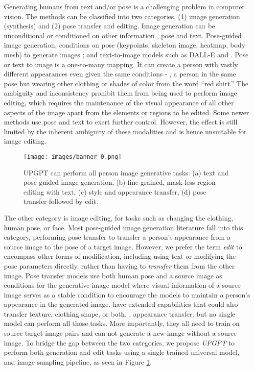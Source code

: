 \documentclass[10pt,twocolumn,letterpaper]{article}
\begin{document}
Generating humans from text and/or pose is a challenging problem in computer vision. The methods can be classified into two categories, (1) image generation (synthesis) and (2) pose transfer and editing. Image generation can be unconditional or conditioned on other information \eg, pose and text. Pose-guided image generation, conditions on pose (keypoints, skeleton image, heatmap, body mesh) to generate images \cite{pix2pix, vqgan, gaugan, AlBahar2021}; and text-to-image models such as DALL-E\cite{dalle,dalle2} and \cite{stackgan,attngan, dmgan, dfgan, xmcgan, imagen}. Pose or text to image is a one-to-many mapping. It can create a person with vastly different appearances even given the same conditions - \eg, a person in the same pose but wearing other clothing or shades of color from the word ``red shirt.'' The ambiguity and inconsistency prohibit them from being used to perform image editing, which requires the maintenance of the visual appearance of all other aspects of the image apart from the elements or regions to be edited. Some newer methods \cite{kpe, text2human, human_diffusion} use pose and text to exert further control. However, the effect is still limited by the inherent ambiguity of these modalities and is hence unsuitable for image editing.

\begin{figure}[!tb]
    \begin{center}
        \texttt{[image: images/banner\_0.png]}
    \end{center}
\caption{UPGPT can perform all person image generative tasks: (a) text and pose guided image generation, (b) fine-grained, mask-less region editing with text, (c) style and appearance transfer, (d) pose transfer followed by edit.} 
\label{fig:banner}
\vspace{-1mm}
\end{figure}
The other category is image editing, for tasks such as changing the clothing, human pose, or face. Most pose-guided image generation literature fall into this category, performing pose transfer to transfer a person's appearance from a source image to the pose of a target image. However, we prefer the term \emph{edit} to encompass other forms of modification, including using text or modifying the pose parameters directly, rather than having to \emph{transfer} them from the other image. Pose transfer models \cite{Ma2017,Siarohin2018,Yang2020} use both human pose and a source image as conditions for the generative image model where visual information of a source image serves as a stable condition to encourage the models to maintain a person's appearance in the generated image. \cite{patn,pise,nted,casd} have extended capabilities that could also transfer texture, clothing shape, or both, \ie, appearance transfer, but no single model can perform all those tasks. More importantly, they all need to train on source-target image pairs and can not generate a new image without a source image. To bridge the gap between the two categories, we propose \emph{UPGPT} to perform both generation and edit tasks using a single trained universal model, and image sampling pipeline, as seen in Figure \ref{fig:banner}.
\end{document}
